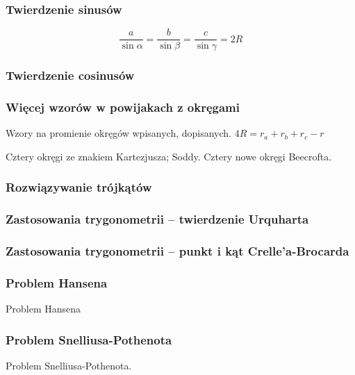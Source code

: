 \subsubsection{Twierdzenie sinusów}

$$\frac{a}{\sin \alpha} = \frac{b}{\sin \beta} = \frac{c}{\sin \gamma} = 2R$$

\subsubsection{Twierdzenie cosinusów}


\subsubsection{Więcej wzorów w powijakach z okręgami}
Wzory na promienie okręgów wpisanych, dopisanych.
$4R = r_a + r_b + r_c - r$ %

Cztery okręgi ze znakiem Kartezjusza; Soddy.
Cztery nowe okręgi Beecrofta.

\subsubsection{Rozwiązywanie trójkątów}


\subsubsection{Zastosowania trygonometrii -- twierdzenie Urquharta}


\subsubsection{Zastosowania trygonometrii -- punkt i kąt Crelle'a-Brocarda}


\subsubsection{Problem Hansena}
Problem Hansena
%

\subsubsection{Problem Snelliusa-Pothenota}
Problem Snelliusa-Pothenota.
%

